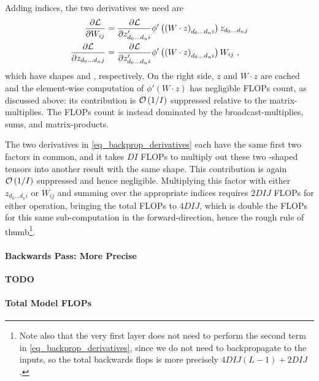 \documentclass[11pt]{article}
\begin{document}
Adding indices, the two derivatives we need are
\begin{align}
    \frac{ \partial \Lcal  }{ \partial W _{ ij } } & = \frac{ \partial \Lcal  }{ \partial z '_{ d _{ 0 } \ldots  d _{ n }i } }\phi' \left (\left (  W \cdot z \right ) _{  d _{ 0 }\ldots d _{ n }i } \right )
	z _{ d _{ 0 }\ldots  d _{ n } j } \nn
	\frac{  \partial \Lcal  }{\partial  z _{ d _{ 0 }\ldots d _{ n }j } } & = \frac{ \partial \Lcal
	}{ \partial z '_{ d _{ 0 } \ldots  d _{ n }i } }\phi' \left (\left (  W \cdot z \right ) _{  d _{
			0 }\ldots d _{ n }i } \right ) W _{ ij }\ ,\label{eq_backprop_derivatives}
\end{align}
which have shapes  and , respectively. On the right
side, $ z $ and $ W \cdot  z $ are cached and the element-wise computation of $ \phi' \left ( W
\cdot z \right ) $ has negligible FLOPs count, as discussed above: its contribution is $ \mathcal{O}
\left( 1/I \right)  $ suppressed relative to the matrix-multiplies. The FLOPs count is instead
dominated by the broadcast-multiplies, sums, and matrix-products.

The two derivatives in \eqref{eq_backprop_derivatives} each have the same first two factors in
common, and it takes $ DI $ FLOPs to multiply out these two -shaped
tensors into another result with the same shape. This contribution is again $ \mathcal{O} \left( 1/I
\right)  $ suppressed and hence negligible. Multiplying this factor with either $ z
_{ d _{ 0 } \ldots d _{ n }i } $ or $ W _{ ij } $ and summing over the appropriate indices requires
$ 2DIJ $ FLOPs for either operation, bringing the total FLOPs to $ 4DIJ$, which is double the FLOPs
for this same sub-computation in the forward-direction, hence the rough rule of thumb\footnote{Note
    also that the very first layer does not need to perform the second term in
    \eqref{eq_backprop_derivatives}, since we do not need to backpropagate to the inputs, so the
    total backwards flops is more precisely $ 4DIJ(L-1) + 2DIJ$.}.


\paragraph{Backwards Pass: More Precise} \textbf{TODO}

\paragraph{Total Model FLOPs}
\end{document}
